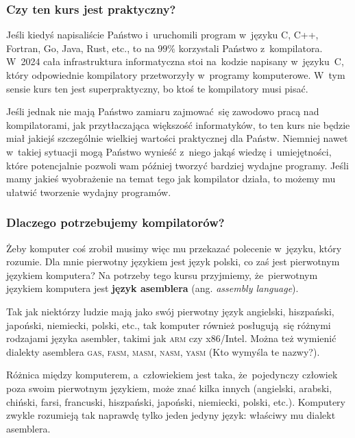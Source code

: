 \documentclass[10pt,t]{beamer}
\begin{document}
\begin{frame}
  \frametitle{Czy ten kurs jest praktyczny?}


  Jeśli kiedyś napisaliście Państwo i~uruchomili program w~języku C, C++,
  Fortran, Go, Java, Rust, etc., to na $99\%$ korzystali Państwo
  z~kompilatora. W~2024 cała infrastruktura informatyczna stoi
  na~kodzie napisany w~języku~C, który odpowiednie kompilatory przetworzyły
  w~programy komputerowe. W~tym sensie kurs ten jest superpraktyczny, bo
  ktoś te kompilatory musi pisać.

  Jeśli jednak nie mają Państwo zamiaru zajmować~się zawodowo pracą nad
  kompilatorami, jak przytłaczająca większość informatyków, to ten kurs nie
  będzie miał jakiejś szczególnie wielkiej wartości praktycznej dla Państw.
  Niemniej nawet w~takiej sytuacji mogą Państwo wynieść z~niego jakąś
  wiedzę i~umiejętności, które potencjalnie pozwoli wam później tworzyć
  bardziej wydajne programy. Jeśli mamy jakieś wyobrażenie na temat tego
  jak kompilator działa, to możemy mu ułatwić tworzenie wydajny programów.

\end{frame}





\begin{frame}
  \frametitle{Dlaczego potrzebujemy kompilatorów?}

  \pause


  Żeby komputer coś zrobił musimy więc mu przekazać polecenie w~języku,
  który rozumie. Dla mnie pierwotny językiem jest język polski, co zaś
  jest pierwotnym językiem komputera? Na potrzeby tego kursu przyjmiemy,
  że~pierwotnym językiem komputera jest \textbf{język asemblera}
  (ang. \textit{assembly language}).

  Tak jak niektórzy ludzie mają jako swój pierwotny język angielski,
  hiszpański, japoński, niemiecki, polski, etc., tak komputer również
  posługują~się różnymi rodzajami języka asembler, takimi jak \textsc{arm}
  czy x86/Intel. Można też wymienić dialekty asemblera \textsc{gas},
  \textsc{fasm}, \textsc{masm}, \textsc{nasm}, \textsc{yasm} (Kto wymyśla
  te nazwy?).

  Różnica między komputerem, a~człowiekiem jest taka, że~pojedynczy człowiek
  poza swoim pierwotnym językiem, może znać kilka innych (angielski,
  arabski, chiński, farsi, francuski, hiszpański, japoński, niemiecki,
  polski, etc.). Komputery zwykle rozumieją tak naprawdę tylko
  \alert{jeden jedyny} język: właściwy mu dialekt asemblera.

\end{frame}
\end{document}
